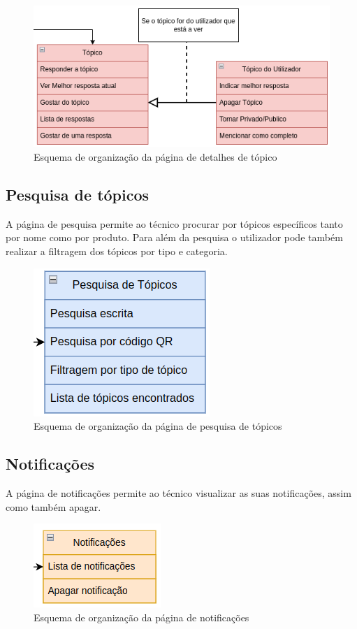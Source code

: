 \begin{figure}[htb]
  \centering
  
  \includegraphics[height=0.35\textwidth]{images/Arquiteturas/superficial_de_app/detalhes_topico.png}
  \caption{Esquema de organização da página de detalhes de tópico}
  \label{fig:7}
\end{figure}

\subsection{Pesquisa de tópicos}

A página de pesquisa permite ao técnico procurar por tópicos específicos tanto por nome como por produto. Para além da pesquisa o utilizador pode também realizar a filtragem dos 
tópicos por tipo e categoria.
\begin{figure}[htb]
  \centering
  
  \includegraphics[height=0.3\textwidth]{images/Arquiteturas/superficial_de_app/pesquisa_forum.png}
  \caption{Esquema de organização da página de pesquisa de tópicos}
  \label{fig:8}
\end{figure}

\newpage

\subsection{Notificações}

A página de notificações permite ao técnico visualizar as suas notificações, assim como também apagar.
\begin{figure}[htb]
  \centering
  
  \includegraphics[height=0.2\textwidth]{images/Arquiteturas/superficial_de_app/notificacoes.png}
  \caption{Esquema de organização da página de notificações}
  \label{fig:9}
\end{figure}

